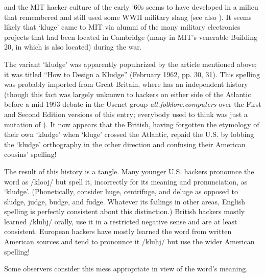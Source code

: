  and the MIT hacker culture of the early '60s seems to have developed in a milieu that remembered and still used some WWII military slang (see also ). It seems likely that `kluge' came to MIT via alumni of the many military electronics projects that had been located in Cambridge (many in MIT's venerable Building 20, in which  is also located) during the war.

The variant `kludge' was apparently popularized by the  article mentioned above; it was titled ``How to Design a Kludge'' (February 1962, pp. 30, 31). This spelling was probably imported from Great Britain, where  has an independent history (though this fact was largely unknown to hackers on either side of the Atlantic before a mid-1993 debate in the Usenet group \textit{alt.folklore.computers} over the First and Second Edition versions of this entry; everybody used to think  was just a mutation of ). It now appears that the British, having forgotten the etymology of their own `kludge' when `kluge' crossed the Atlantic, repaid the U.S. by lobbing the `kludge' orthography in the other direction and confusing their American cousins' spelling!

The result of this history is a tangle. Many younger U.S. hackers pronounce the word as /klooj/ but spell it, incorrectly for its meaning and pronunciation, as `kludge'. (Phonetically, consider huge, centrifuge, and deluge as opposed to sludge, judge, budge, and fudge. Whatever its failings in other areas, English spelling is perfectly consistent about this distinction.) British hackers mostly learned /kluhj/ orally, use it in a restricted negative sense and are at least consistent. European hackers have mostly learned the word from written American sources and tend to pronounce it /kluhj/ but use the wider American spelling!

Some observers consider this mess appropriate in view of the word's meaning.

